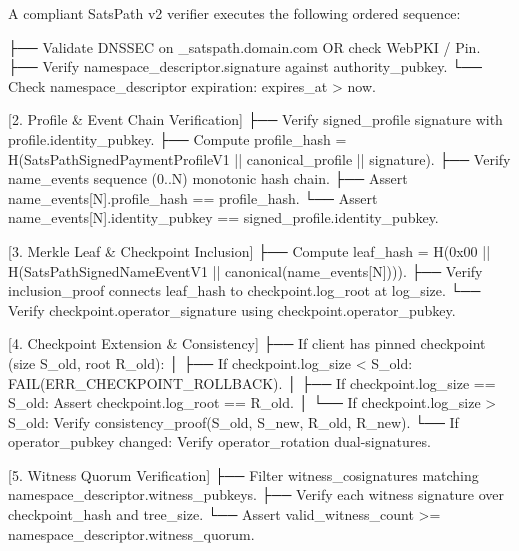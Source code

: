 \documentclass[
]{article}
\newenvironment{Shaded}{}{}
\newcommand{\NormalTok}[1]{#1}
\begin{document}
A compliant SatsPath v2 verifier executes the following ordered
sequence:

\begin{Shaded}
\begin{Highlighting}[]
\NormalTok{[1. Namespace Verification]}
\NormalTok{    ├── Validate DNSSEC on \_satspath.domain.com OR check WebPKI / Pin.}
\NormalTok{    ├── Verify namespace\_descriptor.signature against authority\_pubkey.}
\NormalTok{    └── Check namespace\_descriptor expiration: expires\_at \textgreater{} now.}

\NormalTok{[2. Profile \& Event Chain Verification]}
\NormalTok{    ├── Verify signed\_profile signature with profile.identity\_pubkey.}
\NormalTok{    ├── Compute profile\_hash = H(SatsPathSignedPaymentProfileV1 || canonical\_profile || signature).}
\NormalTok{    ├── Verify name\_events sequence (0..N) monotonic hash chain.}
\NormalTok{    ├── Assert name\_events[N].profile\_hash == profile\_hash.}
\NormalTok{    └── Assert name\_events[N].identity\_pubkey == signed\_profile.identity\_pubkey.}

\NormalTok{[3. Merkle Leaf \& Checkpoint Inclusion]}
\NormalTok{    ├── Compute leaf\_hash = H(0x00 || H(SatsPathSignedNameEventV1 || canonical(name\_events[N]))).}
\NormalTok{    ├── Verify inclusion\_proof connects leaf\_hash to checkpoint.log\_root at log\_size.}
\NormalTok{    └── Verify checkpoint.operator\_signature using checkpoint.operator\_pubkey.}

\NormalTok{[4. Checkpoint Extension \& Consistency]}
\NormalTok{    ├── If client has pinned checkpoint (size S\_old, root R\_old):}
\NormalTok{    │     ├── If checkpoint.log\_size \textless{} S\_old: FAIL(ERR\_CHECKPOINT\_ROLLBACK).}
\NormalTok{    │     ├── If checkpoint.log\_size == S\_old: Assert checkpoint.log\_root == R\_old.}
\NormalTok{    │     └── If checkpoint.log\_size \textgreater{} S\_old: Verify consistency\_proof(S\_old, S\_new, R\_old, R\_new).}
\NormalTok{    └── If operator\_pubkey changed: Verify operator\_rotation dual{-}signatures.}

\NormalTok{[5. Witness Quorum Verification]}
\NormalTok{    ├── Filter witness\_cosignatures matching namespace\_descriptor.witness\_pubkeys.}
\NormalTok{    ├── Verify each witness signature over checkpoint\_hash and tree\_size.}
\NormalTok{    └── Assert valid\_witness\_count \textgreater{}= namespace\_descriptor.witness\_quorum.}
\end{Highlighting}
\end{Shaded}
\end{document}
